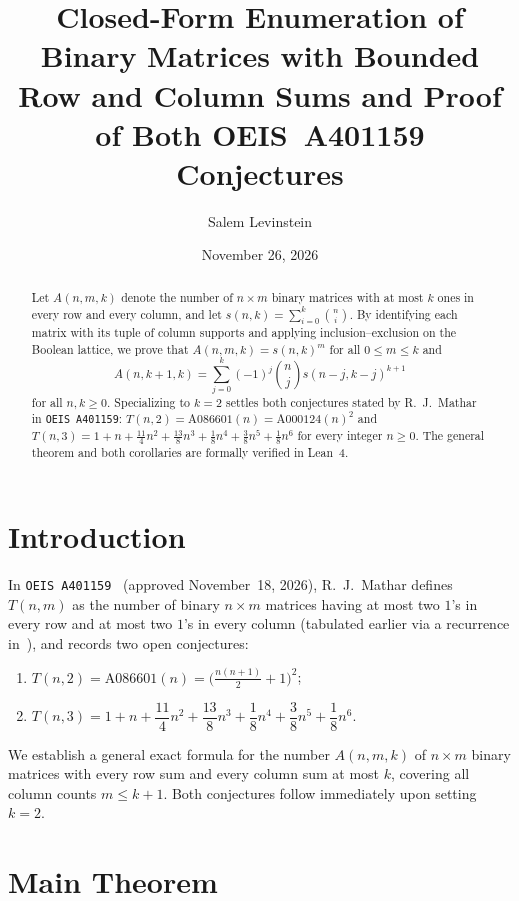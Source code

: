 \documentclass[11pt]{article}
\title{Closed-Form Enumeration of Binary Matrices with Bounded Row and Column Sums and Proof of Both OEIS~A401159 Conjectures}
\author{Salem Levinstein}
\date{November 26, 2026}
\begin{document}
\maketitle

\begin{abstract}
Let $A(n, m, k)$ denote the number of $n \times m$ binary matrices with at most $k$ ones in every row and every column, and let $s(n, k) = \sum_{i=0}^{k} \binom{n}{i}$. By identifying each matrix with its tuple of column supports and applying inclusion--exclusion on the Boolean lattice, we prove that $A(n, m, k) = s(n, k)^m$ for all $0 \le m \le k$ and
\[
  A(n, k + 1, k) = \sum_{j=0}^{k} (-1)^j \binom{n}{j} s(n - j, k - j)^{k + 1}
\]
for all $n, k \ge 0$. Specializing to $k = 2$ settles both conjectures stated by R.~J.~Mathar in \texttt{OEIS~A401159}: $T(n, 2) = \mathrm{A086601}(n) = \mathrm{A000124}(n)^2$ and $T(n, 3) = 1 + n + \frac{11}{4}n^2 + \frac{13}{8}n^3 + \frac{1}{8}n^4 + \frac{3}{8}n^5 + \frac{1}{8}n^6$ for every integer $n \ge 0$. The general theorem and both corollaries are formally verified in Lean~4.
\end{abstract}

\section{Introduction}

In \texttt{OEIS~A401159}~\cite{Mathar2026} (approved November~18, 2026), R.~J.~Mathar defines $T(n, m)$ as the number of binary $n \times m$ matrices having at most two $1$'s in every row and at most two $1$'s in every column (tabulated earlier via a recurrence in~\cite{Mathar2014}), and records two open conjectures:
\begin{enumerate}
  \item $T(n, 2) = \mathrm{A086601}(n) = \bigl(\frac{n(n + 1)}{2} + 1\bigr)^2$;
  \item $T(n, 3) = 1 + n + \dfrac{11}{4}n^2 + \dfrac{13}{8}n^3 + \dfrac{1}{8}n^4 + \dfrac{3}{8}n^5 + \dfrac{1}{8}n^6$.
\end{enumerate}
We establish a general exact formula for the number $A(n, m, k)$ of $n \times m$ binary matrices with every row sum and every column sum at most $k$, covering all column counts $m \le k + 1$. Both conjectures follow immediately upon setting $k = 2$.

\section{Main Theorem}
\end{document}
